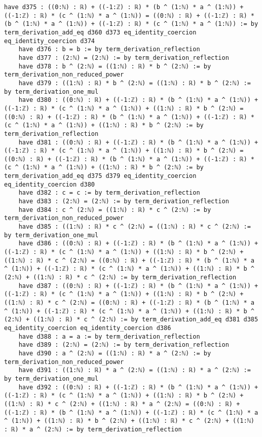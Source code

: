 \documentclass{article}
\begin{document}
\begin{tcolorbox}[colback=white!10, width=\linewidth]
\begin{lstlisting}[language=Lean4]
    have d375 : ((0:ℕ) : ℝ) + ((-1:ℤ) : ℝ) * (b ^ (1:ℕ) * a ^ (1:ℕ)) + ((-1:ℤ) : ℝ) * (c ^ (1:ℕ) * a ^ (1:ℕ)) = ((0:ℕ) : ℝ) + ((-1:ℤ) : ℝ) * (b ^ (1:ℕ) * a ^ (1:ℕ)) + ((-1:ℤ) : ℝ) * (c ^ (1:ℕ) * a ^ (1:ℕ)) := by term_derivation_add_eq d360 d373 eq_identity_coercion eq_identity_coercion d374
    have d376 : b = b := by term_derivation_reflection
    have d377 : (2:ℕ) = (2:ℕ) := by term_derivation_reflection
    have d378 : b ^ (2:ℕ) = ((1:ℕ) : ℝ) * b ^ (2:ℕ) := by term_derivation_non_reduced_power
    have d379 : ((1:ℕ) : ℝ) * b ^ (2:ℕ) = ((1:ℕ) : ℝ) * b ^ (2:ℕ) := by term_derivation_one_mul
    have d380 : ((0:ℕ) : ℝ) + ((-1:ℤ) : ℝ) * (b ^ (1:ℕ) * a ^ (1:ℕ)) + ((-1:ℤ) : ℝ) * (c ^ (1:ℕ) * a ^ (1:ℕ)) + ((1:ℕ) : ℝ) * b ^ (2:ℕ) = ((0:ℕ) : ℝ) + ((-1:ℤ) : ℝ) * (b ^ (1:ℕ) * a ^ (1:ℕ)) + ((-1:ℤ) : ℝ) * (c ^ (1:ℕ) * a ^ (1:ℕ)) + ((1:ℕ) : ℝ) * b ^ (2:ℕ) := by term_derivation_reflection
    have d381 : ((0:ℕ) : ℝ) + ((-1:ℤ) : ℝ) * (b ^ (1:ℕ) * a ^ (1:ℕ)) + ((-1:ℤ) : ℝ) * (c ^ (1:ℕ) * a ^ (1:ℕ)) + ((1:ℕ) : ℝ) * b ^ (2:ℕ) = ((0:ℕ) : ℝ) + ((-1:ℤ) : ℝ) * (b ^ (1:ℕ) * a ^ (1:ℕ)) + ((-1:ℤ) : ℝ) * (c ^ (1:ℕ) * a ^ (1:ℕ)) + ((1:ℕ) : ℝ) * b ^ (2:ℕ) := by term_derivation_add_eq d375 d379 eq_identity_coercion eq_identity_coercion d380
    have d382 : c = c := by term_derivation_reflection
    have d383 : (2:ℕ) = (2:ℕ) := by term_derivation_reflection
    have d384 : c ^ (2:ℕ) = ((1:ℕ) : ℝ) * c ^ (2:ℕ) := by term_derivation_non_reduced_power
    have d385 : ((1:ℕ) : ℝ) * c ^ (2:ℕ) = ((1:ℕ) : ℝ) * c ^ (2:ℕ) := by term_derivation_one_mul
    have d386 : ((0:ℕ) : ℝ) + ((-1:ℤ) : ℝ) * (b ^ (1:ℕ) * a ^ (1:ℕ)) + ((-1:ℤ) : ℝ) * (c ^ (1:ℕ) * a ^ (1:ℕ)) + ((1:ℕ) : ℝ) * b ^ (2:ℕ) + ((1:ℕ) : ℝ) * c ^ (2:ℕ) = ((0:ℕ) : ℝ) + ((-1:ℤ) : ℝ) * (b ^ (1:ℕ) * a ^ (1:ℕ)) + ((-1:ℤ) : ℝ) * (c ^ (1:ℕ) * a ^ (1:ℕ)) + ((1:ℕ) : ℝ) * b ^ (2:ℕ) + ((1:ℕ) : ℝ) * c ^ (2:ℕ) := by term_derivation_reflection
    have d387 : ((0:ℕ) : ℝ) + ((-1:ℤ) : ℝ) * (b ^ (1:ℕ) * a ^ (1:ℕ)) + ((-1:ℤ) : ℝ) * (c ^ (1:ℕ) * a ^ (1:ℕ)) + ((1:ℕ) : ℝ) * b ^ (2:ℕ) + ((1:ℕ) : ℝ) * c ^ (2:ℕ) = ((0:ℕ) : ℝ) + ((-1:ℤ) : ℝ) * (b ^ (1:ℕ) * a ^ (1:ℕ)) + ((-1:ℤ) : ℝ) * (c ^ (1:ℕ) * a ^ (1:ℕ)) + ((1:ℕ) : ℝ) * b ^ (2:ℕ) + ((1:ℕ) : ℝ) * c ^ (2:ℕ) := by term_derivation_add_eq d381 d385 eq_identity_coercion eq_identity_coercion d386
    have d388 : a = a := by term_derivation_reflection
    have d389 : (2:ℕ) = (2:ℕ) := by term_derivation_reflection
    have d390 : a ^ (2:ℕ) = ((1:ℕ) : ℝ) * a ^ (2:ℕ) := by term_derivation_non_reduced_power
    have d391 : ((1:ℕ) : ℝ) * a ^ (2:ℕ) = ((1:ℕ) : ℝ) * a ^ (2:ℕ) := by term_derivation_one_mul
    have d392 : ((0:ℕ) : ℝ) + ((-1:ℤ) : ℝ) * (b ^ (1:ℕ) * a ^ (1:ℕ)) + ((-1:ℤ) : ℝ) * (c ^ (1:ℕ) * a ^ (1:ℕ)) + ((1:ℕ) : ℝ) * b ^ (2:ℕ) + ((1:ℕ) : ℝ) * c ^ (2:ℕ) + ((1:ℕ) : ℝ) * a ^ (2:ℕ) = ((0:ℕ) : ℝ) + ((-1:ℤ) : ℝ) * (b ^ (1:ℕ) * a ^ (1:ℕ)) + ((-1:ℤ) : ℝ) * (c ^ (1:ℕ) * a ^ (1:ℕ)) + ((1:ℕ) : ℝ) * b ^ (2:ℕ) + ((1:ℕ) : ℝ) * c ^ (2:ℕ) + ((1:ℕ) : ℝ) * a ^ (2:ℕ) := by term_derivation_reflection

\end{lstlisting}
\end{tcolorbox}
\end{document}
